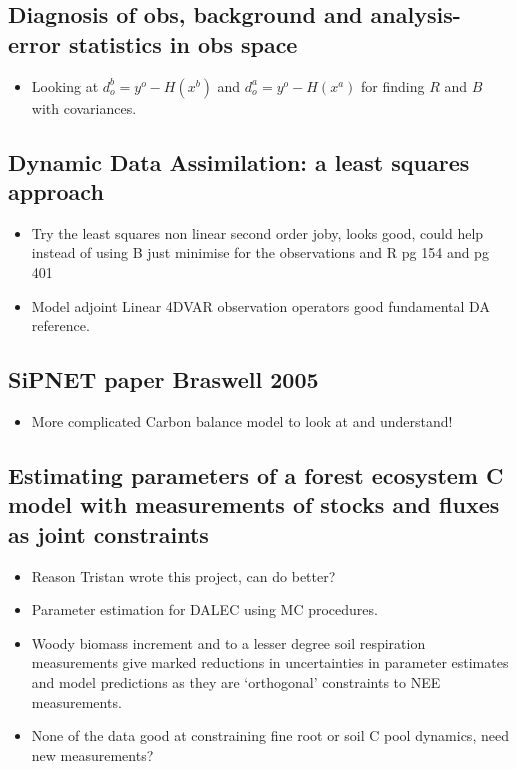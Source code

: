 \documentclass[11pt]{article}
\begin{document}
\subsection*{Diagnosis of obs, background and analysis-error statistics in obs space \cite{desroziers2005diagnosis}}
\begin{itemize}
\item Looking at $d_o^b = y^o-H(x^b)$ and $d_o^a = y^o-H(x^a)$ for finding $R$ and $B$ with covariances.
\end{itemize}


\subsection*{Dynamic Data Assimilation: a least squares approach \cite{lewis2006dynamic}}
\begin{itemize}
\item Try the least squares non linear second order joby, looks good, could help instead of using B just minimise for the observations and R pg 154 and pg 401
\item Model adjoint Linear 4DVAR observation operators good fundamental DA reference.
\end{itemize}


\subsection*{SiPNET paper Braswell 2005 \cite{braswell2005estimating}}
\begin{itemize}
\item More complicated Carbon balance model to look at and understand!
\end{itemize}


\subsection*{Estimating parameters of a forest ecosystem C model with measurements of stocks and fluxes as joint constraints \cite{richardson2010estimating}}
\begin{itemize}
\item Reason Tristan wrote this project, can do better?
\item Parameter estimation for DALEC using MC procedures.
\item Woody biomass increment and to a lesser degree soil respiration measurements give marked reductions in uncertainties in parameter estimates and model predictions as they are `orthogonal' constraints to NEE measurements.
\item None of the data good at constraining fine root or soil C pool dynamics, need new measurements? 
\end{itemize}
\end{document}
